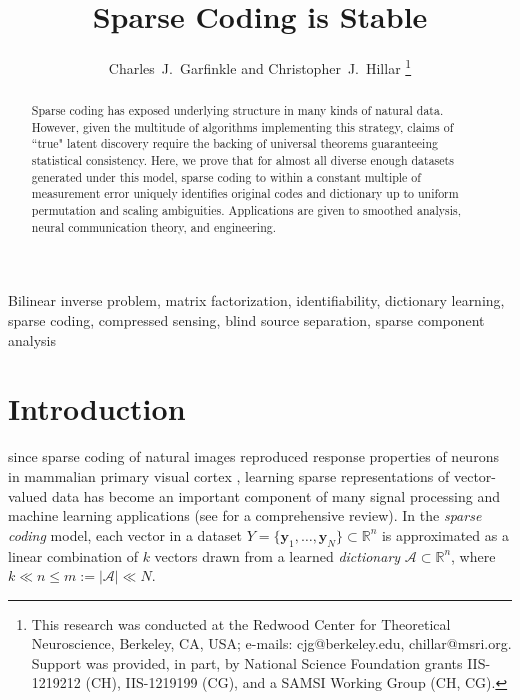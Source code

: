 \documentclass[journal, twocolumn]{IEEEtran}
\begin{document}
\title{Sparse Coding is Stable}

\author{Charles~J.~Garfinkle and Christopher~J.~Hillar
\thanks{This research was conducted at the Redwood Center for Theoretical Neuroscience, Berkeley, CA, USA; e-mails: cjg@berkeley.edu, chillar@msri.org.  Support was provided, in part, by National Science Foundation grants IIS-1219212 (CH), IIS-1219199 (CG), and a SAMSI Working Group (CH, CG).}}

\maketitle

\begin{abstract}
Sparse coding has exposed underlying structure in many kinds of natural data.  However, given the multitude of algorithms implementing this strategy, claims of ``true" latent discovery require the backing of universal theorems guaranteeing statistical consistency.  Here, we prove that for almost all diverse enough datasets generated under this model, sparse coding to within a constant multiple of measurement error uniquely identifies original codes and dictionary up to uniform permutation and scaling ambiguities.  Applications are given to smoothed analysis, neural communication theory, and engineering.
\end{abstract}

\begin{IEEEkeywords}
Bilinear inverse problem, matrix factorization, identifiability, dictionary learning, sparse coding, compressed sensing, blind source separation, sparse component analysis
\end{IEEEkeywords}


\section{Introduction}
 since sparse coding of natural images reproduced response properties of neurons in mammalian primary visual cortex \cite{Olshausen96}, learning sparse representations of vector-valued data has become an important component of many signal processing and machine learning applications (see \cite{Zhang15} for a comprehensive review). In the \textit{sparse coding} model, each vector in a dataset $Y = \{\mathbf{y}_1, \ldots, \mathbf{y}_N\} \subset \mathbb{R}^n$ is approximated as a linear combination of $k$ vectors drawn from a learned \emph{dictionary} $\mathcal{A} \subset \mathbb{R}^n$, where $k \ll n \leq m:= |\mathcal{A}| \ll N$. 
\end{document}
